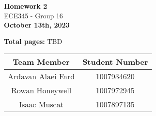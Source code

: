 \begin{titlepage}
    \begin{center}
    {\fontsize{40}{48}\selectfont \bfseries Homework 2} 
    \\\vspace{20pt}
    {\LARGE ECE345 - Group 16} \\
    \vspace{20pt}
    \textbf{October 13th, 2023}
    \vspace{8pt}

    \textbf{Total pages:} TBD
    \end{center}

    \begin{table}[!ht]
        \centering
        \begin{tabular}{|c|c|}
        \hline
            \textbf{Team Member} & \textbf{Student Number} \\ \hline
            Ardavan Alaei Fard & 1007934620 \\ \hline
            Rowan Honeywell & 1007972945 \\ \hline
            Isaac Muscat & 1007897135 \\ \hline
        \end{tabular}
    \end{table}
\end{titlepage}